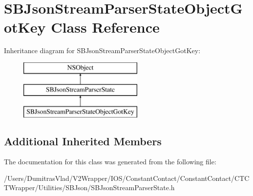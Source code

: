 \hypertarget{interface_s_b_json_stream_parser_state_object_got_key}{\section{S\-B\-Json\-Stream\-Parser\-State\-Object\-Got\-Key Class Reference}
\label{interface_s_b_json_stream_parser_state_object_got_key}
}
Inheritance diagram for S\-B\-Json\-Stream\-Parser\-State\-Object\-Got\-Key\-:\begin{figure}[H]
\begin{center}
\leavevmode
\includegraphics[height=3.000000cm]{interface_s_b_json_stream_parser_state_object_got_key}
\end{center}
\end{figure}
\subsection*{Additional Inherited Members}


The documentation for this class was generated from the following file\-:\begin{DoxyCompactItemize}
\item 
/\-Users/\-Dumitras\-Vlad/\-V2\-Wrapper/\-I\-O\-S/\-Constant\-Contact/\-Constant\-Contact/\-C\-T\-C\-T\-Wrapper/\-Utilities/\-S\-B\-Json/S\-B\-Json\-Stream\-Parser\-State.\-h\end{DoxyCompactItemize}
